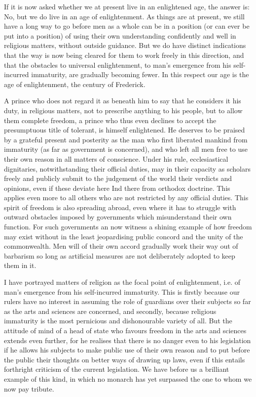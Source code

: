 \documentclass[11pt,twocolumn]{ltugboat}
\begin{document}
If it is now asked whether we at present live in an enlightened age, the answer is: No, but we do live in an age of enlightenment. As things are at present, we still have a long way to go before men as a whole can be in a position (or can ever be put into a position) of using their own understanding confidently and well in religious matters, without outside guidance. But we do have distinct indications that the way is now being cleared for them to work freely in this direction, and that the obstacles to universal enlightenment, to man's emergence from his self-incurred immaturity, are gradually becoming fewer. In this respect our age is the age of enlightenment, the century of Frederick.

A prince who does not regard it as beneath him to say that he considers it his duty, in religious matters, not to prescribe anything to his people, but to allow them complete freedom, a prince who thus even declines to accept the presumptuous title of tolerant, is himself enlightened. He deserves to be praised by a grateful present and posterity as the man who first liberated mankind from immaturity (as far as government is concerned), and who left all men free to use their own reason in all matters of conscience. Under his rule, ecclesiastical dignitaries, notwithstanding their official duties, may in their capacity as scholars freely and publicly submit to the judgement of the world their verdicts and opinions, even if these deviate here Ind there from orthodox doctrine. This applies even more to all others who are not restricted by any official duties. This spirit of freedom is also spreading abroad, even where it has to struggle with outward obstacles imposed by governments which misunderstand their own function. For such governments an now witness a shining example of how freedom may exist without in the least jeopardising public concord and the unity of the commonwealth. Men will of their own accord gradually work their way out of barbarism so long as artificial measures are not deliberately adopted to keep them in it.

I have portrayed matters of religion as the focal point of enlightenment, i.e. of man's emergence from his self-incurred immaturity. This is firstly because our rulers have no interest in assuming the role of guardians over their subjects so far as the arts and sciences are concerned, and secondly, because religious immaturity is the most pernicious and dishonourable variety of all. But the attitude of mind of a head of state who favours freedom in the arts and sciences extends even further, for he realises that there is no danger even to his legislation if he allows his subjects to make public use of their own reason and to put before the public their thoughts on better ways of drawing up laws, even if this entails forthright criticism of the current legislation. We have before us a brilliant example of this kind, in which no monarch has yet surpassed the one to whom we now pay tribute.
\end{document}
